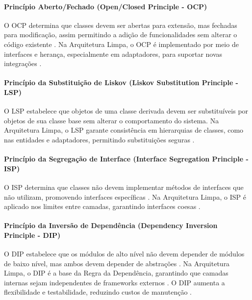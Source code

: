             \paragraph{Princípio Aberto/Fechado (Open/Closed Principle - OCP)}

                \par O OCP determina que classes devem ser abertas para extensão, mas fechadas para modificação, assim permitindo a adição de funcionalidades sem alterar o código existente \cite{livro:martin:cleanarch}. Na Arquitetura Limpa, o OCP é implementado por meio de interfaces e herança, especialmente em adaptadores, para suportar novas integrações \cite{livro:martin:cleanarch}. 

            \paragraph{Princípio da Substituição de Liskov (Liskov Substitution Principle - LSP)}

                \par O LSP estabelece que objetos de uma classe derivada devem ser substituíveis por objetos de sua classe base sem alterar o comportamento do sistema. Na Arquitetura Limpa, o LSP garante consistência em hierarquias de classes, como nas entidades e adaptadores, permitindo substituições seguras \cite{livro:martin:cleanarch}.

            \paragraph{Princípio da Segregação de Interface (Interface Segregation Principle - ISP)}
            
                \par O ISP determina que classes não devem implementar métodos de interfaces que não utilizam, promovendo interfaces específicas \cite{livro:martin:cleanarch}. Na Arquitetura Limpa, o ISP é aplicado nos limites entre camadas, garantindo interfaces coesas \cite{livro:martin:cleanarch}.
                
            \paragraph{Princípio da Inversão de Dependência (Dependency Inversion Principle - DIP)}
            
                \par O DIP estabelece que os módulos de alto nível não devem depender de módulos de baixo nível, mas ambos devem depender de abstrações \cite{livro:martin:cleanarch}. Na Arquitetura Limpa, o DIP é a base da Regra da Dependência, garantindo que camadas internas sejam independentes de frameworks externos \cite{livro:martin:cleanarch}. O DIP aumenta a flexibilidade e testabilidade, reduzindo custos de manutenção \cite{artigo:dantas:2021}.
            
